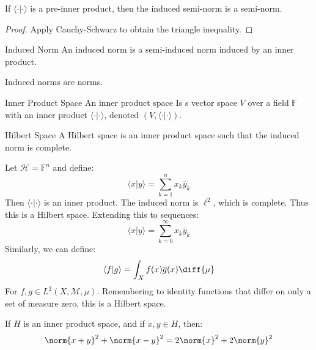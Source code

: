    \begin{theorem}
        If $\langle{\cdot|\cdot}\rangle$ is a pre-inner
        product, then the induced semi-norm is a semi-norm.
    \end{theorem}
    \begin{proof}
        Apply Cauchy-Schwarz to obtain the triangle inequality.
    \end{proof}
    \begin{ldefinition}{Induced Norm}
        An induced norm is a semi-induced norm induced
        by an inner product.
    \end{ldefinition}
    \begin{theorem}
        Induced norms are norms.
    \end{theorem}
    \begin{ldefinition}{Inner Product Space}
        An inner product space Is s vector space
        $V$ over a field $\mathbb{F}$ with an
        inner product $\langle{\cdot|\cdot}\rangle$,
        denoted $(V,\langle{\cdot|\cdot}\rangle)$.
    \end{ldefinition}
    \begin{ldefinition}{Hilbert Space}
        A Hilbert space is an inner product space
        such that the induced norm is complete.
    \end{ldefinition}
    \begin{lexample}
        Let $\mathcal{H}=\mathbb{F}^{n}$ and define:
        \begin{equation}
            \langle{x|y}\rangle
            =\sum_{k=1}^{n}x_{k}\overline{y}_{k}
        \end{equation}
        Then $\langle{\cdot|\cdot}\rangle$ is an inner product.
        The induced norm is $\ell^{2}$, which is complete.
        Thus this is a Hilbert space. Extending this to
        sequences:
        \begin{equation}
            \langle{x|y}\rangle
            =\sum_{k=0}^{\infty}x_{k}\overline{y}_{k}
        \end{equation}
        Similarly, we can define:
        \begin{equation}
            \langle{f|g}\rangle
            =\int_{X}f(x)\overline{g}(x)\diff{\mu}
        \end{equation}
        For $f,g\in{L}^{2}(X,\mathcal{M},\mu)$. Remembering
        to identity functions that differ on only a set
        of measure zero, this is a Hilbert space.
    \end{lexample}
    \begin{theorem}
        If $H$ is an inner product space, and if
        $x,y\in{H}$, then:
        \begin{equation}
            \norm{x+y}^{2}+\norm{x-y}^{2}=
            2\norm{x}^{2}+2\norm{y}^{2}
        \end{equation}
    \end{theorem}
